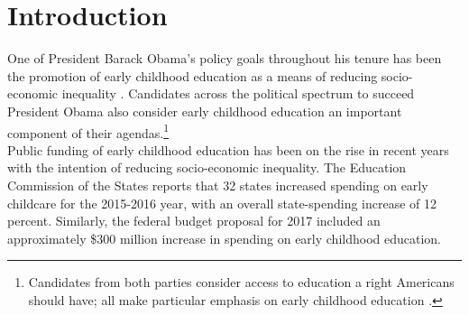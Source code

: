 \singlespacing
\tableofcontents
\listoffigures
\listoftables
\pagebreak

\section{Introduction}

\noindent One of President Barack Obama's policy goals throughout his tenure has been the promotion of early childhood education as a means of reducing socio-economic inequality \citep{Bajaj_Labaton_2009_ObamaRiskAssets,White_House_2014_Econ_of_EC_Investments,White_House_2014_Fact_Sheet_Press}. Candidates across the political spectrum to succeed President Obama also consider early childhood education an important component of their agendas.\footnote{Candidates from both parties consider access to education a right Americans should have; all make particular emphasis on early childhood education \citep{Hillary-for-Am_2016_Universal-Preschool,On-the-Issues_2016_Sanders-on-Families,On-the-Issues_2016_Cruz-on-Education}.}\\ 

\noindent Public funding of early childhood education has been on the rise in recent years with the intention of reducing socio-economic inequality. The Education Commission of the States reports that 32 states increased spending on early childcare for the 2015-2016 year, with an overall state-spending increase of 12 percent. Similarly, the federal budget proposal for 2017 included an approximately \$300 million increase in spending on early childhood education.\\

